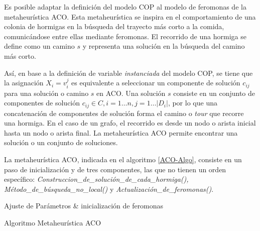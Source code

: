 Es posible adaptar la definici\'on del modelo COP al modelo de feromonas de la metaheur\'istica ACO. Esta metaheur\'istica se inspira en el comportamiento de una colonia de hormigas en la b\'usqueda del trayecto m\'as corto a la comida, comunic\'andose entre ellas mediante feromonas. El recorrido de una hormiga se define como un camino $s$ y representa una soluci\'on en la b\'usqueda del camino m\'as corto.


As\'i, en base a la definici\'on de variable {\it instanciada} del modelo COP, se tiene que la asignaci\'on $X_i = v_{i}^{j}$ es equivalente a seleccionar un componente de soluci\'on $c_{ij}$ para una soluci\'on o camino $s$ en ACO.
Una soluci\'on $s$ consiste en un conjunto de componentes de soluci\'on $c_{ij} \in C, i = 1 \dotsc n, j = 1 \dotsc |D_i|$, por lo que una concatenaci\'on de componentes de soluci\'on forma el camino o {\it tour} que recorre una hormiga. En el caso de un grafo, el recorrido es desde un nodo o arista inicial hasta un nodo o arista final. La metaheur\'istica ACO permite encontrar una soluci\'on o un conjunto de soluciones. 
 
La metaheur\'istica ACO, indicada en el algoritmo \ref{ACO-Algo}, consiste en un paso de inicializaci\'on y de tres componentes, las que no tienen un orden espec\'ifico: {\it Construccion\_de\_soluci\'on\_de\_cada\_hormiga(),  M\'etodo\_de\_b\'usqueda\_no\_local()} y {\it Actualizaci\'on\_de\_feromonas()}.


\begin{algorithm}[H]
\SetAlgoLined
{}
 Ajuste de Par\'ametros \& inicializaci\'on de feromonas \;
 \caption{Algoritmo Metaheur\'istica ACO}\label{ACO-Algo}
\end{algorithm}



